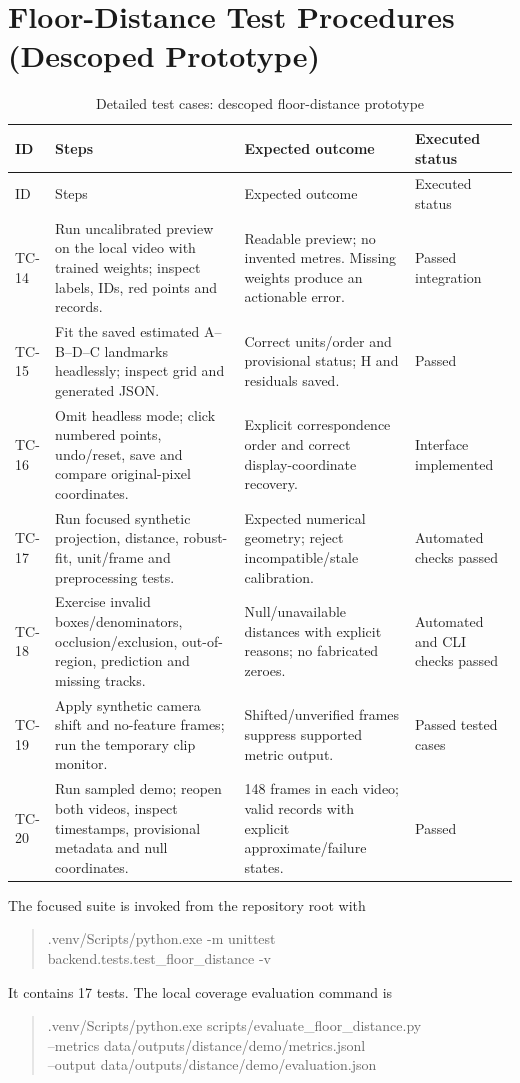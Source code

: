 \section{Floor-Distance Test Procedures (Descoped Prototype)}
\begin{longtable}{P{0.09\textwidth}P{0.35\textwidth}P{0.30\textwidth}P{0.14\textwidth}}
\caption{Detailed test cases: descoped floor-distance prototype}\\
\toprule
ID & Steps & Expected outcome & Executed status\\
\midrule
\endfirsthead
\toprule
ID & Steps & Expected outcome & Executed status\\
\midrule
\endhead
TC-14 & Run uncalibrated preview on the local video with trained weights; inspect labels, IDs, red points and records. & Readable preview; no invented metres. Missing weights produce an actionable error. & Passed integration\\
TC-15 & Fit the saved estimated A--B--D--C landmarks headlessly; inspect grid and generated JSON. & Correct units/order and provisional status; H and residuals saved. & Passed\\
TC-16 & Omit headless mode; click numbered points, undo/reset, save and compare original-pixel coordinates. & Explicit correspondence order and correct display-coordinate recovery. & Interface implemented\\
TC-17 & Run focused synthetic projection, distance, robust-fit, unit/frame and preprocessing tests. & Expected numerical geometry; reject incompatible/stale calibration. & Automated checks passed\\
TC-18 & Exercise invalid boxes/denominators, occlusion/exclusion, out-of-region, prediction and missing tracks. & Null/unavailable distances with explicit reasons; no fabricated zeroes. & Automated and CLI checks passed\\
TC-19 & Apply synthetic camera shift and no-feature frames; run the temporary clip monitor. & Shifted/unverified frames suppress supported metric output. & Passed tested cases\\
TC-20 & Run sampled demo; reopen both videos, inspect timestamps, provisional metadata and null coordinates. & 148 frames in each video; valid records with explicit approximate/failure states. & Passed\\
\bottomrule
\end{longtable}
The focused suite is invoked from the repository root with
\begin{quote}\small\ttfamily
.venv/Scripts/python.exe -m unittest\\
\hspace*{1em}backend.tests.test\_floor\_distance -v
\end{quote}
It contains 17 tests. The local coverage evaluation command is
\begin{quote}\small\ttfamily
.venv/Scripts/python.exe scripts/evaluate\_floor\_distance.py\\
\hspace*{1em}--metrics data/outputs/distance/demo/metrics.jsonl\\
\hspace*{1em}--output data/outputs/distance/demo/evaluation.json
\end{quote}

